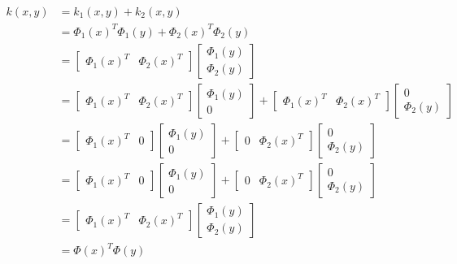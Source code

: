 \documentclass{article}
\begin{document}
\begin{align*}
    k(x,y) &= k_1(x,y) + k_2(x,y) \\
    &= \Phi_1 {(x)}^T \Phi_1 (y) + \Phi_2 {(x)}^T \Phi_2 (y) \\
    &= \begin{bmatrix}
        \Phi_1 {(x)}^T & \Phi_2 {(x)}^T
    \end{bmatrix}
    \begin{bmatrix}
        \Phi_1 (y) \\
        \Phi_2 (y)
    \end{bmatrix} \\
    &= \begin{bmatrix}
        \Phi_1 {(x)}^T & \Phi_2 {(x)}^T
    \end{bmatrix}
    \begin{bmatrix}
        \Phi_1 (y) \\
        0
    \end{bmatrix} +
    \begin{bmatrix}
        \Phi_1 {(x)}^T & \Phi_2 {(x)}^T
    \end{bmatrix}
    \begin{bmatrix}
        0 \\
        \Phi_2 (y)
    \end{bmatrix} \\
    &= \begin{bmatrix}
        \Phi_1 {(x)}^T & 0
    \end{bmatrix}
    \begin{bmatrix}
        \Phi_1 (y) \\
        0
    \end{bmatrix} +
    \begin{bmatrix}
        0 & \Phi_2 {(x)}^T
    \end{bmatrix}
    \begin{bmatrix}
        0 \\
        \Phi_2 (y)
    \end{bmatrix} \\
    &= \begin{bmatrix}
        \Phi_1 {(x)}^T & 0
    \end{bmatrix}
    \begin{bmatrix}
        \Phi_1 (y) \\
        0
    \end{bmatrix} +
    \begin{bmatrix}
        0 & \Phi_2 {(x)}^T
    \end{bmatrix}
    \begin{bmatrix}
        0 \\
        \Phi_2 (y)
    \end{bmatrix} \\
    &= \begin{bmatrix}
        \Phi_1 {(x)}^T &
        \Phi_2 {(x)}^T
    \end{bmatrix}
    \begin{bmatrix}
        \Phi_1 (y) \\
        \Phi_2 (y)
    \end{bmatrix} \\
    &= \Phi {(x)}^T \Phi (y)
\end{align*}
\end{document}
